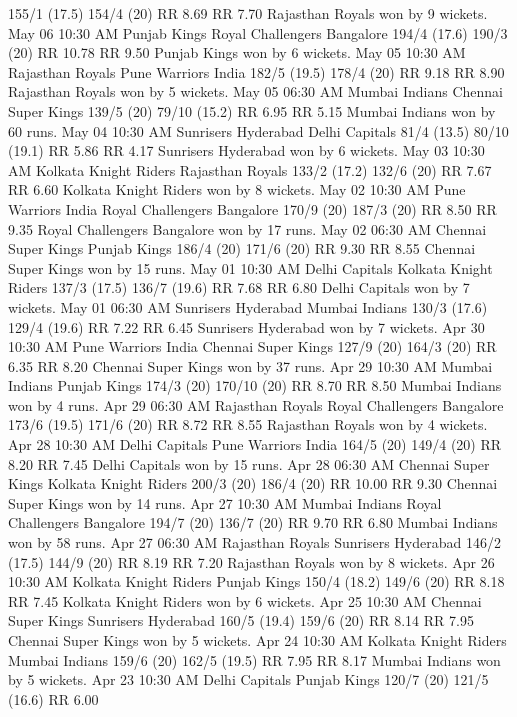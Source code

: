 155/1 (17.5)
154/4 (20)
RR 8.69
RR 7.70
Rajasthan Royals won by 9 wickets.
May 06
10:30 AM
Punjab Kings
Royal Challengers Bangalore
194/4 (17.6)
190/3 (20)
RR 10.78
RR 9.50
Punjab Kings won by 6 wickets.
May 05
10:30 AM
Rajasthan Royals
Pune Warriors India
182/5 (19.5)
178/4 (20)
RR 9.18
RR 8.90
Rajasthan Royals won by 5 wickets.
May 05
06:30 AM
Mumbai Indians
Chennai Super Kings
139/5 (20)
79/10 (15.2)
RR 6.95
RR 5.15
Mumbai Indians won by 60 runs.
May 04
10:30 AM
Sunrisers Hyderabad
Delhi Capitals
81/4 (13.5)
80/10 (19.1)
RR 5.86
RR 4.17
Sunrisers Hyderabad won by 6 wickets.
May 03
10:30 AM
Kolkata Knight Riders
Rajasthan Royals
133/2 (17.2)
132/6 (20)
RR 7.67
RR 6.60
Kolkata Knight Riders won by 8 wickets.
May 02
10:30 AM
Pune Warriors India
Royal Challengers Bangalore
170/9 (20)
187/3 (20)
RR 8.50
RR 9.35
Royal Challengers Bangalore won by 17 runs.
May 02
06:30 AM
Chennai Super Kings
Punjab Kings
186/4 (20)
171/6 (20)
RR 9.30
RR 8.55
Chennai Super Kings won by 15 runs.
May 01
10:30 AM
Delhi Capitals
Kolkata Knight Riders
137/3 (17.5)
136/7 (19.6)
RR 7.68
RR 6.80
Delhi Capitals won by 7 wickets.
May 01
06:30 AM
Sunrisers Hyderabad
Mumbai Indians
130/3 (17.6)
129/4 (19.6)
RR 7.22
RR 6.45
Sunrisers Hyderabad won by 7 wickets.
Apr 30
10:30 AM
Pune Warriors India
Chennai Super Kings
127/9 (20)
164/3 (20)
RR 6.35
RR 8.20
Chennai Super Kings won by 37 runs.
Apr 29
10:30 AM
Mumbai Indians
Punjab Kings
174/3 (20)
170/10 (20)
RR 8.70
RR 8.50
Mumbai Indians won by 4 runs.
Apr 29
06:30 AM
Rajasthan Royals
Royal Challengers Bangalore
173/6 (19.5)
171/6 (20)
RR 8.72
RR 8.55
Rajasthan Royals won by 4 wickets.
Apr 28
10:30 AM
Delhi Capitals
Pune Warriors India
164/5 (20)
149/4 (20)
RR 8.20
RR 7.45
Delhi Capitals won by 15 runs.
Apr 28
06:30 AM
Chennai Super Kings
Kolkata Knight Riders
200/3 (20)
186/4 (20)
RR 10.00
RR 9.30
Chennai Super Kings won by 14 runs.
Apr 27
10:30 AM
Mumbai Indians
Royal Challengers Bangalore
194/7 (20)
136/7 (20)
RR 9.70
RR 6.80
Mumbai Indians won by 58 runs.
Apr 27
06:30 AM
Rajasthan Royals
Sunrisers Hyderabad
146/2 (17.5)
144/9 (20)
RR 8.19
RR 7.20
Rajasthan Royals won by 8 wickets.
Apr 26
10:30 AM
Kolkata Knight Riders
Punjab Kings
150/4 (18.2)
149/6 (20)
RR 8.18
RR 7.45
Kolkata Knight Riders won by 6 wickets.
Apr 25
10:30 AM
Chennai Super Kings
Sunrisers Hyderabad
160/5 (19.4)
159/6 (20)
RR 8.14
RR 7.95
Chennai Super Kings won by 5 wickets.
Apr 24
10:30 AM
Kolkata Knight Riders
Mumbai Indians
159/6 (20)
162/5 (19.5)
RR 7.95
RR 8.17
Mumbai Indians won by 5 wickets.
Apr 23
10:30 AM
Delhi Capitals
Punjab Kings
120/7 (20)
121/5 (16.6)
RR 6.00
